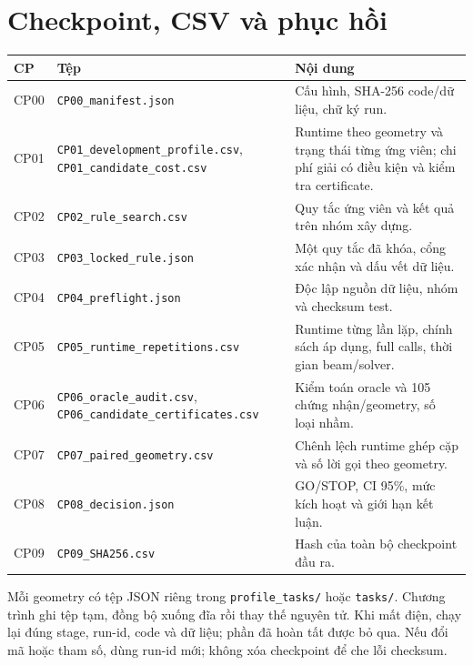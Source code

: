 \documentclass[11pt,onecolumn]{IEEEtran}
\begin{document}
\section{Checkpoint, CSV và phục hồi}
\begin{center}\footnotesize
\begin{tabular}{p{14mm}p{58mm}p{78mm}}
\toprule
\textbf{CP} & \textbf{Tệp} & \textbf{Nội dung}\\ \midrule
CP00 & \texttt{CP00\_manifest.json} & Cấu hình, SHA-256 code/dữ liệu, chữ ký run.\\
CP01 & \texttt{CP01\_development\_profile.csv}, \texttt{CP01\_candidate\_cost.csv} & Runtime theo geometry và trạng thái từng ứng viên; chi phí giải có điều kiện và kiểm tra certificate.\\
CP02 & \texttt{CP02\_rule\_search.csv} & Quy tắc ứng viên và kết quả trên nhóm xây dựng.\\
CP03 & \texttt{CP03\_locked\_rule.json} & Một quy tắc đã khóa, cổng xác nhận và dấu vết dữ liệu.\\
CP04 & \texttt{CP04\_preflight.json} & Độc lập nguồn dữ liệu, nhóm và checksum test.\\
CP05 & \texttt{CP05\_runtime\_repetitions.csv} & Runtime từng lần lặp, chính sách áp dụng, full calls, thời gian beam/solver.\\
CP06 & \texttt{CP06\_oracle\_audit.csv}, \texttt{CP06\_candidate\_certificates.csv} & Kiểm toán oracle và 105 chứng nhận/geometry, số loại nhầm.\\
CP07 & \texttt{CP07\_paired\_geometry.csv} & Chênh lệch runtime ghép cặp và số lời gọi theo geometry.\\
CP08 & \texttt{CP08\_decision.json} & GO/STOP, CI 95\%, mức kích hoạt và giới hạn kết luận.\\
CP09 & \texttt{CP09\_SHA256.csv} & Hash của toàn bộ checkpoint đầu ra.\\
\bottomrule
\end{tabular}
\end{center}
Mỗi geometry có tệp JSON riêng trong \texttt{profile\_tasks/} hoặc \texttt{tasks/}. Chương trình ghi tệp tạm, đồng bộ xuống đĩa rồi thay thế nguyên tử. Khi mất điện, chạy lại đúng stage, run-id, code và dữ liệu; phần đã hoàn tất được bỏ qua. Nếu đổi mã hoặc tham số, dùng run-id mới; không xóa checkpoint để che lỗi checksum.
\end{document}
